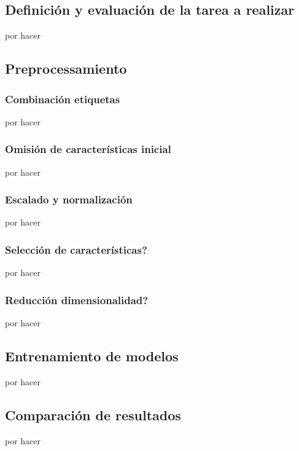 \subsection{Definición y evaluación de la tarea a realizar}

por hacer

\subsection{Preprocessamiento}

\subsubsection{Combinación etiquetas}
por hacer

\subsubsection{Omisión de características inicial}
por hacer

\subsubsection{Escalado y normalización}
por hacer

\subsubsection{Selección de características?}
por hacer

\subsubsection{Reducción dimensionalidad?}
por hacer

\subsection{Entrenamiento de modelos}

por hacer

\subsection{Comparación de resultados}

por hacer

